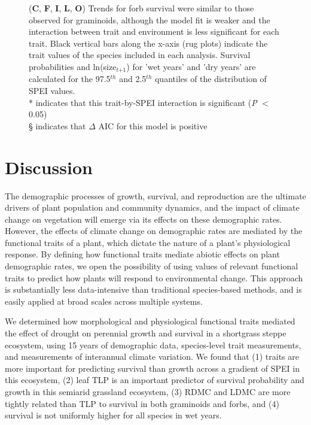 \documentclass[12pt, letterpaper]{article}
\begin{document}
\begin{figure}
{(\textbf{C}, \textbf{F}, \textbf{I}, \textbf{L}, \textbf{O}) Trends for forb survival were similar to those observed for graminoids, although the model fit is weaker and the interaction between trait and environment is less significant for each trait. %
Black vertical bars along the x-axis (rug plots) indicate the trait values of the species included in each analysis. Survival probabilities and ln(size$_\textit{t+1}$) for 'wet years' and 'dry years' are calculated for the 97.5$^{th}$ and 2.5$^{th}$ quantiles of the distribution of SPEI values. \\
* indicates that this trait-by-SPEI interaction is significant (\textit{P} $<$ 0.05)\\
§ indicates that $\Delta$ AIC for this model is positive
}
 \label{fig:test}
\end{figure}

\section{Discussion}
The demographic processes of growth, survival, and reproduction are the ultimate drivers of plant population and community dynamics, and the impact of climate change on vegetation will emerge via its effects on these demographic rates. However, the effects of climate change on demographic rates are mediated by the functional traits of a plant, which dictate the nature of a plant’s physiological response. By defining how functional traits mediate abiotic effects on plant demographic rates, we open the possibility of using values of relevant functional traits to predict how plants will respond to environmental change. This approach is substantially less data-intensive than traditional species-based methods, and is easily applied at broad scales across multiple systems. 

We determined how morphological and physiological functional traits mediated the effect of drought on perennial growth and survival in a shortgrass steppe ecosystem, using 15 years of demographic data, species-level trait measurements, and measurements of interannual climate variation. We found that (1) traits are more important for predicting survival than growth across a gradient of SPEI in this ecosystem, (2) leaf TLP is an important predictor of survival probability and growth in this semiarid grassland ecosystem, (3) RDMC and LDMC are more tightly related than TLP to survival in both graminoids and forbs, and (4) survival is not uniformly higher for all species in wet years.
\end{document}
